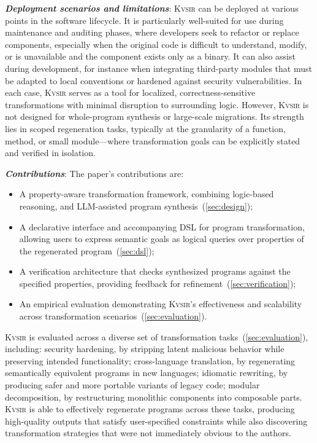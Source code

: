 \documentclass[sigplan]{acmart}
\newcommand{\sys}{{\scshape Kv{\textalpha}sir}\xspace}
\newcommand{\heading}[1]{\vspace{2pt}\noindent\textbf{\emph{#1}}:\enspace}
\begin{document}
\heading{Deployment scenarios and limitations}
\sys can be deployed at various points in the software lifecycle.
It is particularly well-suited for use during maintenance and auditing phases, where developers seek to refactor or replace components, especially when the original code is difficult to understand, modify, or is unavailable and the component exists only as a binary.
It can also assist during development, for instance when integrating third-party modules that must be adapted to local conventions or hardened against security vulnerabilities.
In each case, \sys serves as a tool for localized, correctness-sensitive transformations with minimal disruption to surrounding logic.
However, \sys is not designed for whole-program synthesis or large-scale migrations.
Its strength lies in scoped regeneration tasks, typically at the granularity of a function, method, or small module—where transformation goals can be explicitly stated and verified in isolation.


\heading{Contributions}
The paper's contributions are:
\begin{itemize}
  \item A property-aware transformation framework, combining logic-based reasoning, and LLM-assisted program synthesis~(\cref{sec:design});
 \item A declarative interface and accompanying DSL for program transformation, allowing users to express semantic goals as logical queries over properties of the regenerated program~(\cref{sec:dsl});
 \item A verification architecture that checks synthesized programs against the specified properties, providing feedback for refinement~(\cref{sec:verification});
 \item An empirical evaluation demonstrating \sys's effectiveness and scalability across transformation scenarios~(\cref{sec:evaluation}).
\end{itemize}

\sys is evaluated across a diverse set of transformation tasks~(\cref{sec:evaluation}), including:
	security hardening, by stripping latent malicious behavior while preserving intended functionality;
	cross-language translation, by regenerating semantically equivalent programs in new languages;
	idiomatic rewriting, by producing safer and more portable variants of legacy code;
	modular decomposition, by restructuring monolithic components into composable parts.
\sys is able to effectively regenerate programs across these tasks, producing high-quality outputs that satisfy user-specified constraints while also discovering transformation strategies that were not immediately obvious to the authors.
\end{document}
